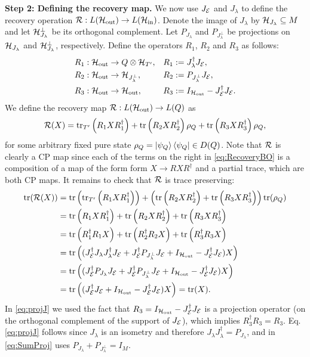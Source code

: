 \documentclass[10pt]{article}
\newcommand{\SIN}{\mathrm{in}}
\newcommand{\SOUT}{\mathrm{out}}
\newcommand{\tr}{\mathrm{tr}}
\newcommand{\p}[1]{\left(#1\right)}
\begin{document}
\noindent\textbf{Step 2: Defining the recovery map.} We now use $J_{{\cal E}}$ and $J_{\lambda}$ to define the recovery operation $\calR:L(\calH_{\SOUT})\to L(\calH_{\SIN})$. Denote the image of $J_{\lambda}$ by ${\cal H}_{J_{\lambda}}\subseteq M$ and let ${\cal H}_{J_{\lambda}}^\perp$ be its orthogonal complement. Let $P_{J_{\lambda}}$ and $P_{J_{\lambda}^{\perp}}$ be projections on ${\cal H}_{J_{\lambda}}$ and ${\cal H}_{J_{\lambda}}^\perp$, respectively. Define the operators $R_1$, $R_2$ and $R_3$ as follows:
\begin{align}
    \nonumber&R_1:\calH_{\SOUT}\to Q\otimes \calH_{T'}, && R_1:=J_{\lambda}^{\dag} J_{\calE},\\
    \nonumber&R_{2}:\calH_{\SOUT}\to \calH_{J_{\lambda}^{\perp}}, &&R_2:=P_{J_{\lambda}^\perp} J_{\calE}, \\ &R_3:\calH_{\SOUT}\to \calH_{\SOUT}, && R_3:= I_{\calH_{\SOUT}}-J_{\calE}^{\dag}J_{\calE}.\label{eq:R_iDef}
\end{align}
 We define the recovery map $\calR:L(\calH_{\SOUT} )\to L(Q)$ as 
\begin{equation}
    \calR(X)=\tr_{{T'}}\p{R_1 X R_1^\dag}+\tr\p{R_2 X R_2^\dag} \rho_Q +\tr\p{R_3 X R_3^\dag}\rho_Q,\label{eq:RecoveryBO}
\end{equation}
for some arbitrary fixed pure state $\rho_Q=\ket{\psi_Q}\bra{\psi_Q}\in D(Q)$. Note that ${\cal R}$ is clearly a CP map since each of the terms on the right in \eqref{eq:RecoveryBO} is a composition of a map of the form form $X\to RXR^\dag$ and a partial trace, which are both CP maps. It remains to check that ${\cal R}$ is trace preserving: 
\begin{align}
    \tr(\calR(X))&\nonumber= \tr\p{\tr_{{T'}}\p{R_1 X R_1^\dag}}+\p{\tr\p{R_2 X R_2^\dag}  +\tr\p{R_3 X R_3^\dag}}\tr(\rho_Q)\\
    &\nonumber=\tr\p{R_1 X R_1^\dag} +\tr\p{R_2 XR_2^\dag}+\tr\p{R_3 X R_3^\dag}\\
      &\nonumber=\tr\p{  R_1^\dag R_1 X} +\tr\p{R_2^\dag R_2 X}+\tr\p{ R_3^\dag R_3 X}\\
     &\label{eq:projJ}=\tr\p{(J_\calE^\dag J_{\lambda}J_{\lambda}^\dag J_{\calE} +J_\calE^\dag P_{J_\lambda^\perp} J_{\calE}+I_{\calH_{\SOUT}}-J_\calE^\dag  J_{\calE})X}
     \\&\label{eq:projJ_lambda}=\tr\p{(J_\calE^\dag P_{J_{\lambda}} J_{\calE} +J_\calE^\dag P_{J_\lambda^\perp} J_{\calE}+I_{\calH_{\SOUT}}-J_\calE^\dag  J_{\calE})X}\\
     &\label{eq:SumProj}=\tr\p{(J_\calE^\dag J_{\calE}+I_{\calH_{\SOUT}}-J_\calE^\dag  J_{\calE})X}=\tr(X).
\end{align}
In \eqref{eq:projJ} we used the fact that $R_3=I_{\calH_{\SOUT}}-J_{\calE}^\dag J_{\calE}$ is a projection operator (on the orthogonal complement of the support of $J_{{\cal E}}$), which implies $R_3^\dag R_3=R_3$. Eq. \eqref{eq:projJ} 
follows since $J_{\lambda}$ is an isometry and therefore $J_{\lambda}J_{\lambda}^\dag=P_{J_{\lambda}}$, and in \eqref{eq:SumProj} uses $P_{J_{\lambda}}+P_{J_{\lambda}^{\perp}}=I_{M}$.\vspace{0.2cm}
\end{document}
